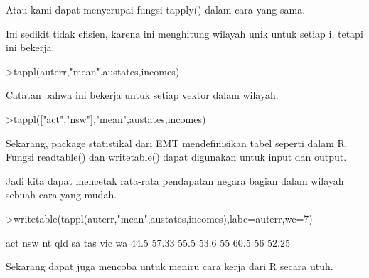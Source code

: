 \documentclass[a4paper,10pt]{article}
\begin{document}
\begin{eulernotebook}
\begin{eulercomment}
\begin{eulercomment}
\begin{eulercomment}
\begin{eulercomment}
\begin{eulercomment}
Atau kami dapat menyerupai fungsi tapply() dalam cara yang sama.
\end{eulercomment}
\begin{eulercomment}
Ini sedikit tidak efisien, karena ini menghitung wilayah unik untuk
setiap i, tetapi ini bekerja.
\end{eulercomment}
\begin{eulerprompt}
>tappl(auterr,"mean",austates,incomes)
\end{eulerprompt}
\begin{euleroutput}
  [44.5,  57.3333333333,  55.5,  53.6,  55,  60.5,  56,  52.25]
\end{euleroutput}
\begin{eulercomment}
Catatan bahwa ini bekerja untuk setiap vektor dalam wilayah.
\end{eulercomment}
\begin{eulerprompt}
>tappl(["act","nsw"],"mean",austates,incomes)
\end{eulerprompt}
\begin{euleroutput}
  [44.5,  57.3333333333]
\end{euleroutput}
\begin{eulercomment}
Sekarang, package statistikal dari EMT mendefinisikan tabel seperti
dalam R. Fungsi readtable() dan writetable() dapat digunakan untuk
input dan output.

Jadi kita dapat mencetak rata-rata pendapatan negara bagian dalam
wilayah sebuah cara yang mudah.
\end{eulercomment}
\begin{eulerprompt}
>writetable(tappl(auterr,"mean",austates,incomes),labc=auterr,wc=7)
\end{eulerprompt}
\begin{euleroutput}
      act    nsw     nt    qld     sa    tas    vic     wa
     44.5  57.33   55.5   53.6     55   60.5     56  52.25
\end{euleroutput}
\begin{eulercomment}
Sekarang dapat juga mencoba untuk meniru cara kerja dari R secara
utuh.


\end{eulercomment}
\end{eulercomment}
\end{eulercomment}
\end{eulercomment}
\end{eulercomment}
\end{eulernotebook}
\end{document}
